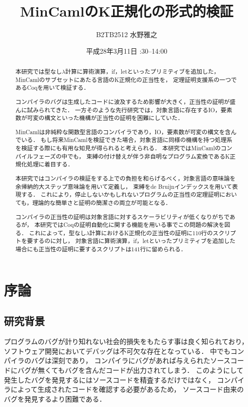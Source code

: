 \documentclass{sumiilab-paper}
\title{MinCamlのK正規化の形式的検証}
\author{B2TB2512 水野雅之}
\institute{東北大学 工学部\\情報知能システム総合学科}%
\date{平成28年3月11日 \quad 13:30--14:00}
\begin{document}
\maketitle

\begin{abstract}
本研究では型なし$\lambda$計算に算術演算，if，letといったプリミティブを追加した，
MinCamlのサブセットにあたる言語のK正規化の正当性を，
定理証明支援系の一つであるCoqを用いて検証する．

コンパイラのバグは生成したコードに波及するため影響が大きく，正当性の証明が盛んに試みられてきた．
一方そのような先行研究では，対象言語に存在するIO，要素数が可変の構文といった機構が正当性の証明を困難にしていた．

MinCamlは非純粋な関数型言語のコンパイラであり，IO，要素数が可変の構文を含んでいる．
もし将来MinCamlを検証できた場合，対象言語に同様の機構を持つ処理系を検証する際にも有用な知見が得られると考えられる．
本研究ではMinCamlのコンパイルフェーズの中でも，
束縛の付け替えが伴う非自明なプログラム変換であるK正規化処理に着目する．

本研究ではコンパイラの検証をする上での負担を和らげるべく，対象言語の意味論を余帰納的大ステップ意味論を用いて定義し，
束縛をde Bruijnインデックスを用いて表現する．
これにより，停止しないかもしれないプログラムの正当性の定理証明においても，理論的な簡単さと証明の簡潔さの両立が可能となる．

コンパイラの正当性の証明は対象言語に対するスケーラビリティが低くなりがちであるが，
本研究ではCoqの証明自動化に関する機能を用いる事でこの問題の解決を図る．
これによって，型なし$\lambda$計算におけるK正規化の正当性の証明に110行のスクリプトを要するのに対し，
対象言語に算術演算，if，letといったプリミティブを追加した場合にも正当性の証明に要するスクリプトは141行に留められる．
\end{abstract}

\tableofcontents


\chapter{序論}


\section{研究背景}
プログラムのバグが計り知れない社会的損失をもたらす事は良く知られており，
ソフトウェア開発においてデバッグは不可欠な存在となっている．
中でもコンパイラのバグは深刻であり，
コンパイラにバグがあれば与えられたソースコードにバグが無くてもバグを含んだコードが出力されてしまう．
このようにして発生したバグを発見するにはソースコードを精査するだけではなく，
コンパイラによって生成されたコードを確認する必要があるため，
ソースコード由来のバグを発見するより困難である．
\end{document}
